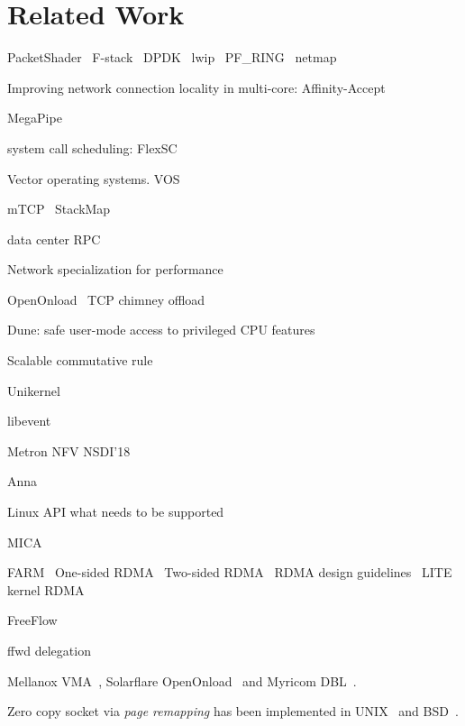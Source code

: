 \section{Related Work}
\label{sec:related}

PacketShader~\cite{han2010packetshader}
F-stack~\cite{fstack}
DPDK~\cite{dpdk} lwip~\cite{dunkels2001design}
PF\_RING~\cite{pf-ring}
netmap~\cite{rizzo2012netmap}

Improving network connection locality in multi-core:
Affinity-Accept~\cite{pesterev2012improving}


MegaPipe~\cite{han2012megapipe}

system call scheduling:
FlexSC~\cite{soares2010flexsc}

Vector operating systems.
VOS~\cite{vasudevan2011case}

mTCP~\cite{jeong2014mtcp}
StackMap~\cite{yasukata2016stackmap}

data center RPC~\cite{stuedi2014darpc}

Network specialization for performance~\cite{marinos2014network}

OpenOnload~\cite{openonload}
TCP chimney offload~\cite{networking2004network}

Dune: safe user-mode access to privileged CPU features~\cite{belay2012dune}

Scalable commutative rule~\cite{clements2015scalable}

Unikernel~\cite{madhavapeddy2013unikernels}

libevent~\cite{libevent}

Metron NFV NSDI'18~\cite{metron2018nsdi}

Anna~\cite{anna}

Linux API what needs to be supported~\cite{tsai2016study}

MICA~\cite{lim2014mica}

FARM~\cite{dragojevic2014farm}
One-sided RDMA~\cite{mitchell2013using}
Two-sided RDMA~\cite{kalia2014using}
RDMA design guidelines~\cite{kaminsky2016design}
LITE kernel RDMA~\cite{tsai2017lite}

FreeFlow~\cite{freeflow}


ffwd delegation~\cite{roghanchi2017ffwd}

Mellanox VMA~\cite{libvma}, Solarflare OpenOnload~\cite{openonload} and Myricom DBL~\cite{dbl}.

Zero copy socket via \textit{page remapping} has been implemented in UNIX~\cite{thadani1995efficient} and BSD~\cite{chu1996zero}. 

